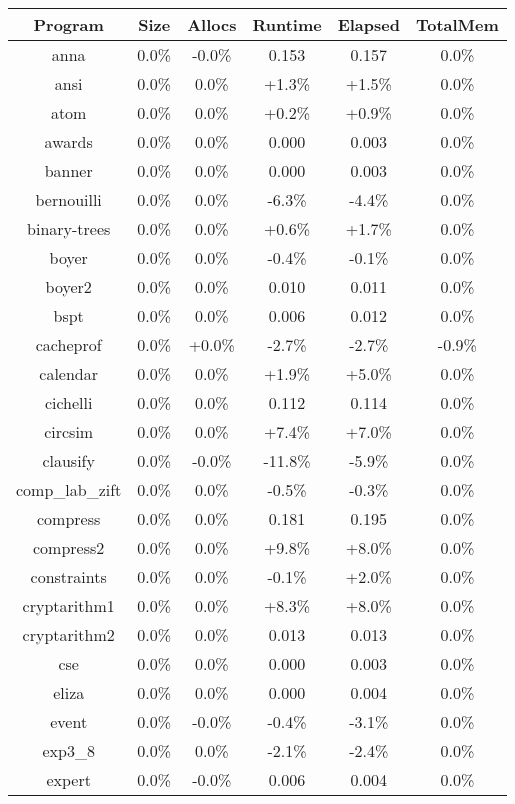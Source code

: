 \begin{tabular}{ c c c c c c }
Program & Size & Allocs & Runtime & Elapsed & TotalMem\\
\hline
anna &  0.0\% & -0.0\% & 0.153 & 0.157 &  0.0\%\\
ansi &  0.0\% &  0.0\% & +1.3\% & +1.5\% &  0.0\%\\
atom &  0.0\% &  0.0\% & +0.2\% & +0.9\% &  0.0\%\\
awards &  0.0\% &  0.0\% & 0.000 & 0.003 &  0.0\%\\
banner &  0.0\% &  0.0\% & 0.000 & 0.003 &  0.0\%\\
bernouilli &  0.0\% &  0.0\% & -6.3\% & -4.4\% &  0.0\%\\
binary-trees &  0.0\% &  0.0\% & +0.6\% & +1.7\% &  0.0\%\\
boyer &  0.0\% &  0.0\% & -0.4\% & -0.1\% &  0.0\%\\
boyer2 &  0.0\% &  0.0\% & 0.010 & 0.011 &  0.0\%\\
bspt &  0.0\% &  0.0\% & 0.006 & 0.012 &  0.0\%\\
cacheprof &  0.0\% & +0.0\% & -2.7\% & -2.7\% & -0.9\%\\
calendar &  0.0\% &  0.0\% & +1.9\% & +5.0\% &  0.0\%\\
cichelli &  0.0\% &  0.0\% & 0.112 & 0.114 &  0.0\%\\
circsim &  0.0\% &  0.0\% & +7.4\% & +7.0\% &  0.0\%\\
clausify &  0.0\% & -0.0\% & -11.8\% & -5.9\% &  0.0\%\\
comp\_lab\_zift &  0.0\% &  0.0\% & -0.5\% & -0.3\% &  0.0\%\\
compress &  0.0\% &  0.0\% & 0.181 & 0.195 &  0.0\%\\
compress2 &  0.0\% &  0.0\% & +9.8\% & +8.0\% &  0.0\%\\
constraints &  0.0\% &  0.0\% & -0.1\% & +2.0\% &  0.0\%\\
cryptarithm1 &  0.0\% &  0.0\% & +8.3\% & +8.0\% &  0.0\%\\
cryptarithm2 &  0.0\% &  0.0\% & 0.013 & 0.013 &  0.0\%\\
cse &  0.0\% &  0.0\% & 0.000 & 0.003 &  0.0\%\\
eliza &  0.0\% &  0.0\% & 0.000 & 0.004 &  0.0\%\\
event &  0.0\% & -0.0\% & -0.4\% & -3.1\% &  0.0\%\\
exp3\_8 &  0.0\% &  0.0\% & -2.1\% & -2.4\% &  0.0\%\\
expert &  0.0\% & -0.0\% & 0.006 & 0.004 &  0.0\%\\

\end{tabular}
